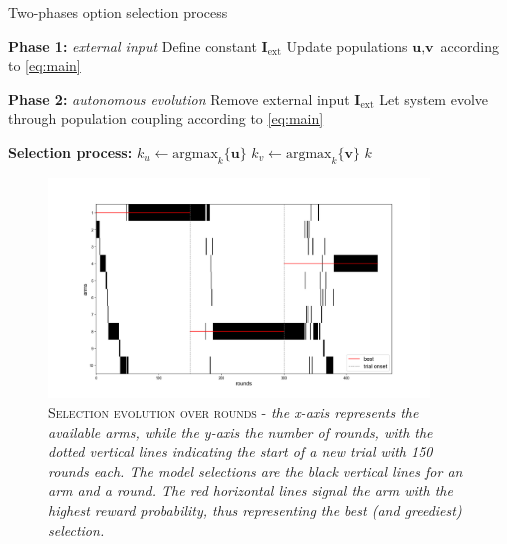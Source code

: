 \hfill \break
\begin{algorithm}[H]
\caption{Two-phases option selection process}
\label{alg:decision}
\SetAlgoLined
{}


\textbf{Phase 1:} \textit{external input} 
Define constant $\textbf{I}_{\text{ext}}$\;
Update populations $\textbf{u}, \textbf{v}$ according to \ref{eq:main}\;

\textbf{Phase 2:} \textit{autonomous evolution} 
Remove external input $\textbf{I}_{\text{ext}}$\;
Let system evolve through population coupling according to \ref{eq:main}\;

\textbf{Selection process:}\;
$k_{u} \gets \text{argmax}_{k}\{\textbf{u}\}$\;
$k_{v} \gets \text{argmax}_{k}\{\textbf{v}\}$\;
\Return $k$
\end{algorithm}

%
\begin{figure}[ht]
    \centering
    \includegraphics[width=0.9\textwidth]{figures/selections_1.png}
    \caption{\textsc{Selection evolution over rounds} - \textit{the x-axis represents the available arms, while the y-axis the number of rounds, with the dotted vertical lines indicating the start of a new trial with 150 rounds each. The model selections are the black vertical lines for an arm and a
    round. The red horizontal lines signal the arm with the highest reward probability, thus representing the best (and greediest) selection.}}
    \label{fig:sel1}
\end{figure}

